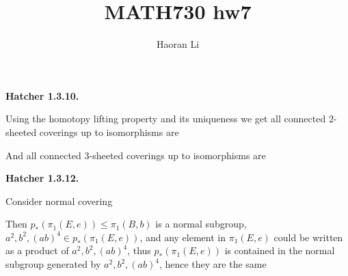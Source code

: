 \documentclass[12pt]{article}
\title{MATH730 hw7}
\author{Haoran Li}
\date{}
\begin{document}
\maketitle
\textbf{Hatcher 1.3.10.} \par
Using the homotopy lifting property and its uniqueness we get all connected $2$-sheeted coverings up to isomorphisms are \par
\vspace{2cm}
\iffalse
\begin{center}
\begin{tikzpicture}
\begin{scope}[decoration={markings,mark=at position 0.5 with {\arrow{>}}}]
\draw[postaction={decorate}] (0,0) to [out=60,in=-180] (1,1) node [above] {\footnotesize $a$} to [out=0,in=120] (2,0);
\draw[postaction={decorate}] (0,0) to [out=-60,in=-180] (1,-1) node [below] {\footnotesize $b$} to [out=0,in=-120] (2,0);
\draw[postaction={decorate}] (2,0) to [out=135,in=0] (1,0.5) node [below] {\footnotesize $a$} to [out=-180,in=45] (0,0);
\draw[postaction={decorate}] (2,0) to [out=-135,in=0] (1,-0.5) node [above] {\footnotesize $b$} to [out=-180,in=-45] (0,0);
\end{scope}
\end{tikzpicture}
\begin{tikzpicture}
\begin{scope}[decoration={markings,mark=at position 0.5 with {\arrow{>}}}]
\draw[postaction={decorate}] (0,0) to [out=30,in=-180] (1,0.3) node [above] {\footnotesize $a$} to [out=0,in=150] (2,0);
\draw[postaction={decorate}] (0,0) to [out=-30,in=-180] (1,-0.3) node [below] {\footnotesize $a$} to [out=0,in=-150] (2,0);
\draw[postaction={decorate}] (-0.3,0) circle (0.3);
\node [right] (-0.6,0) {\footnotesize $b$};
\draw[postaction={decorate},rotate=180] (-2.3,0) circle (0.3);
\node [right] (2.6,0) {\footnotesize $b$};
\end{scope}
\end{tikzpicture}
\end{center}
\fi
And all connected $3$-sheeted coverings up to isomorphisms are \par
\vspace{3cm}
\textbf{Hatcher 1.3.12.} \par
Consider normal covering \par
\vspace{3cm}
Then $p_{*}(\pi_1(E,e))\leq \pi_1(B,b)$ is a normal subgroup, $a^2,b^2,(ab)^4\in p_{*}(\pi_1(E,e))$, and any element in $\pi_1(E,e)$ could be written as a product of $a^2,b^2,(ab)^4$, thus $p_{*}(\pi_1(E,e))$ is contained in the normal subgroup generated by $a^2,b^2,(ab)^4$, hence they are the same \par
\end{document}
